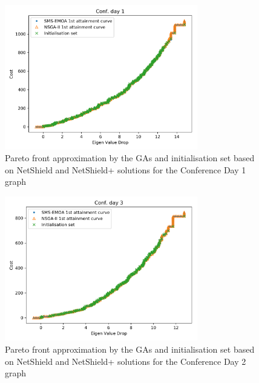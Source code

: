 \documentclass[11pt]{article}
\theoremstyle{definition}
\begin{document}
\begin{figure}[h!]
  \centering
    \includegraphics[width=0.75\textwidth]{results_ns_init/day1_attainment_nsinit}
  \caption{Pareto front approximation by the GAs and initialisation set based on NetShield and NetShield+ solutions for the Conference Day 1 graph}
  \label{fig:day1_atins}
\end{figure}

\begin{figure}[h!]
  \centering
    \includegraphics[width=0.75\textwidth]{results_ns_init/day3_attainment_nsinit}
  \caption{Pareto front approximation by the GAs and initialisation set based on NetShield and NetShield+ solutions for the Conference Day 2 graph}
  \label{fig:day3_atins}
\end{figure}
\end{document}
